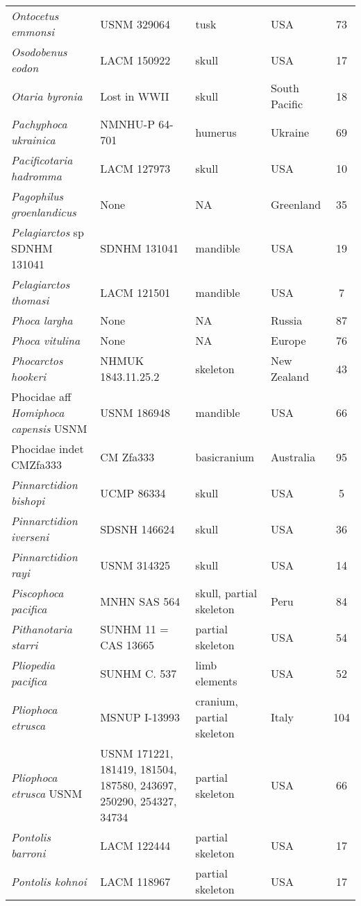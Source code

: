 \begin{longtable}{p{}p{}p{}lc}
\textit{Ontocetus emmonsi} &	USNM 329064 & 	tusk & 	USA & 73\\
\textit{Osodobenus eodon} &	LACM 150922 & 	skull & 	USA & 17\\
\textit{Otaria byronia} &	Lost in WWII & 	skull & 	South Pacific & 18\\
\textit{Pachyphoca ukrainica} & NMNHU-P 64-701	& humerus	& Ukraine & 69\\
\textit{Pacificotaria hadromma} & LACM 127973	& skull	& USA & 10\\
\textit{Pagophilus groenlandicus} &	None & 	NA & 	Greenland & 35\\
\textit{Pelagiarctos} sp SDNHM 131041 &	SDNHM 131041 & 	mandible & 	USA & 19\\
\textit{Pelagiarctos thomasi} &	LACM 121501 & 	mandible & 	USA & 7\\
\textit{Phoca largha} &	None & 	NA & 	Russia	 & 87\\
\textit{Phoca vitulina} &	None & 	NA & 	Europe & 76\\
\textit{Phocarctos hookeri} &	NHMUK 1843.11.25.2 & 	skeleton & 	New Zealand & 43\\
Phocidae aff \textit{Homiphoca capensis} USNM	& USNM 186948	& mandible	& USA & 66\\
Phocidae indet CMZfa333	& CM Zfa333 & 	basicranium & 	Australia & 95\\
\textit{Pinnarctidion bishopi} &	UCMP 86334 & 	skull & 	USA & 5\\
\textit{Pinnarctidion iverseni} &	SDSNH 146624 & 	skull & 	USA & 36\\
\textit{Pinnarctidion rayi} &	USNM 314325 & 	skull & 	USA & 14\\
\textit{Piscophoca pacifica} &	MNHN SAS 564 & 	skull, partial skeleton	 & Peru & 84\\
\textit{Pithanotaria starri} &	SUNHM 11 = CAS 13665 & 	partial skeleton & 	USA & 54\\
\textit{Pliopedia pacifica} &	SUNHM C. 537 & 	limb elements & 	USA & 52\\
\textit{Pliophoca etrusca} &	MSNUP I-13993 & 	cranium, partial skeleton & 	Italy & 104\\
\textit{Pliophoca etrusca} USNM & USNM 171221, 181419, 181504, 187580, 243697, 250290, 254327, 34734 &	partial skeleton & USA & 66\\
\textit{Pontolis barroni} &	LACM 122444 & 	partial skeleton & 	USA & 17\\
\textit{Pontolis kohnoi} &	LACM 118967 & 	partial skeleton & 	USA & 17\\

\end{longtable}
